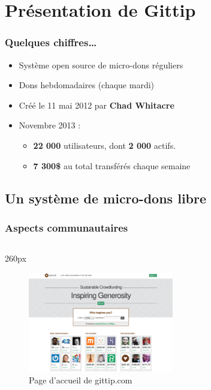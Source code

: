     \section{Présentation de Gittip}


\begin{frame}
\frametitle{Quelques chiffres\ldots}

\begin{itemize}
    \itemsep1.5em
    \item Système open source de micro-dons réguliers
    \item Dons hebdomadaires (chaque mardi)
    \item Créé le 11 mai 2012 par \textbf{Chad Whitacre}
    \item Novembre 2013 :
        \begin{itemize}
            \item \textbf{22 000} utilisateurs, dont \textbf{2 000} actifs.
            \item \textbf{7 300\${}} au total transférés chaque semaine
        \end{itemize}
\end{itemize}
\end{frame}


    \subsection{Un système de micro-dons libre}


{
\logo{}
\begin{frame}
\frametitle{Aspects communautaires}
\begin{center}
\begin{columns}
\begin{column}{260px}
{
    \begin{figure}[h!]
        \centering
        \includegraphics[width=240px]{images/section1/homepage-gittip.eps}
        \caption{Page d'accueil de gittip.com}
    \end{figure}
}
\end{column}
\end{columns}
\end{center}
\end{frame}
}


